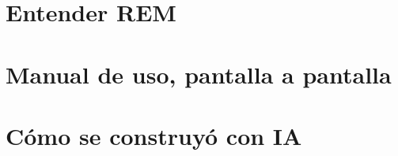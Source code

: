 \documentclass[11pt,a4paper,twoside,openright]{book}
\begin{document}
\frontmatter


\tableofcontents

\mainmatter
\part{Entender REM}



\part{Manual de uso, pantalla a pantalla}












\part{Cómo se construyó con IA}


\appendix

\backmatter
\end{document}
